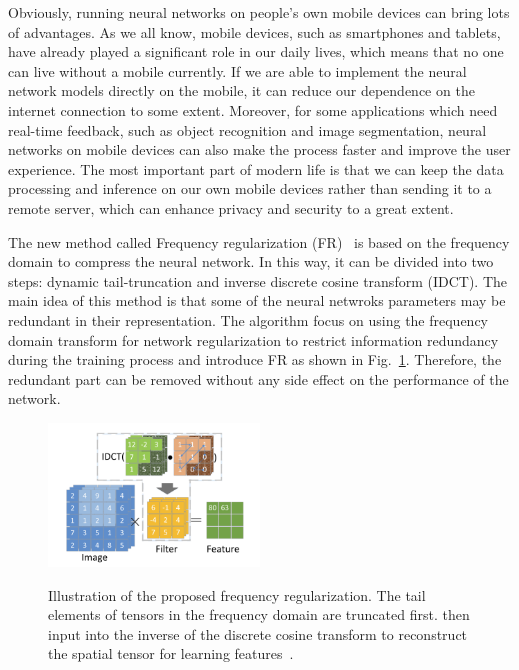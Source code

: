 \documentclass[UTF8]{article}
\begin{document}
Obviously, running neural networks on people’s own mobile devices can bring lots of advantages. As we all know, mobile devices, such as smartphones and tablets, have already played a significant role in our daily lives, which means that no one can live without a mobile currently. If we are able to implement the neural network models directly on the mobile, it can reduce our dependence on the internet connection to some extent. Moreover, for some applications which need real-time feedback, such as object recognition and image segmentation, neural networks on mobile devices can also make the process faster and improve the user experience. The most important part of modern life is that we can keep the data processing and inference on our own mobile devices rather than sending it to a remote server, which can enhance privacy and security to a great extent.

The new method called Frequency regularization (FR)~\cite{zhao2023frequency} is based on the frequency domain to compress the neural network. In this way, it can be divided into two steps: dynamic tail-truncation and inverse discrete cosine transform (IDCT). The main idea of this method is that some of the neural netwroks parameters may be redundant in their representation. The algorithm focus on using the frequency domain transform for network regularization to restrict information redundancy during the training process and introduce FR as shown in Fig.~\ref{idct}. Therefore, the redundant part can be removed without any side effect on the performance of the network.

\begin{figure}
	\vspace{-15pt}    %
	\includegraphics[width=0.5\textwidth]{figure/idct.png}\\
	\vspace{-15pt}    %
	\caption{Illustration of the proposed frequency regularization. The tail elements of tensors in the frequency domain are truncated first. then input into the inverse of the discrete cosine transform to reconstruct the spatial tensor for learning features~\cite{zhao2023frequency}.}
	\label{idct}
	\vspace{-15pt}    %
\end{figure}
\end{document}
